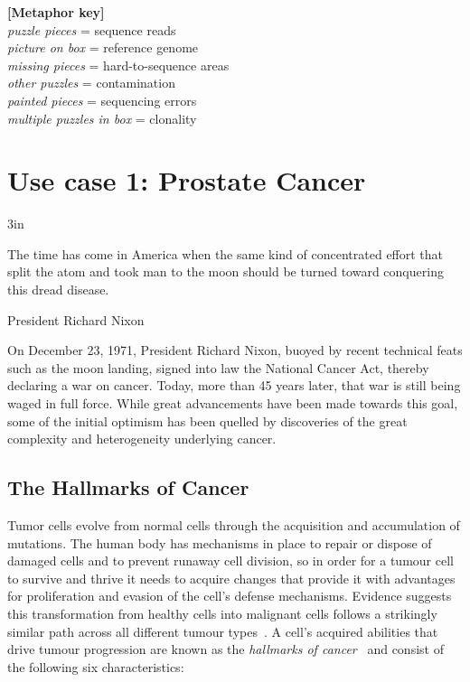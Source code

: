 \begin{justify}
\begin{center}
\begin{minipage}{6in}
\begin{center}
{\vspace*{0.5cm}
\textbf{[Metaphor key]} \\
\textit{puzzle pieces} = sequence reads \\
\textit{picture on box} = reference genome \\
\textit{missing pieces} = hard-to-sequence areas \\
\textit{other puzzles} = contamination \\
\textit{painted pieces} = sequencing errors \\
\textit{multiple puzzles in box} = clonality
}

\end{center}
\end{minipage}
\end{center}



\newpage
\section{Use case 1: Prostate Cancer}

\epigraph{3in}{The time has come in America when the same kind of concentrated effort that split the atom and took man to the moon should be turned toward conquering this dread disease.}{President Richard Nixon}

On December 23, 1971, President Richard Nixon, buoyed by recent technical feats such as the moon landing, signed into law the National Cancer Act, thereby declaring a war on cancer. Today, more than 45 years later, that war is still being waged in full force. While great advancements have been made towards this goal, some of the initial optimism has been quelled by discoveries of the great complexity and heterogeneity underlying cancer.


\subsection{The Hallmarks of Cancer}

Tumor cells evolve from normal cells through the acquisition and accumulation of mutations. The human body has mechanisms in place to repair or dispose of damaged cells and to prevent runaway cell division, so in order for a tumour cell to survive and thrive it needs to acquire changes that provide it with advantages for proliferation and evasion of the cell's defense mechanisms. Evidence suggests this transformation from healthy cells into malignant cells follows a strikingly similar path across all different tumour types~\cite{TODO}. A cell's acquired abilities that drive tumour progression are known as the \emph{hallmarks of cancer}~\cite{hanahan2000hallmarks,hanahan2011hallmarks} and consist of the following six characteristics:


\end{justify}
